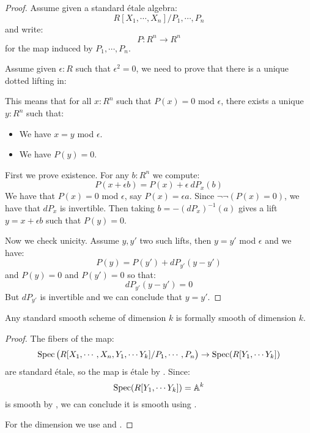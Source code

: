 \begin{proof}
Assume given a standard étale algebra:
\[R[X_1,\cdots,X_n]/P_1,\cdots,P_n\]
and write:
\[P:R^n\to R^n\]
for the map induced by $P_1,\cdots,P_n$.

Assume given $\epsilon:R$ such that $\epsilon^2=0$, we need to prove that there is a unique dotted lifting in:
  \begin{center}
    \end{center}
This means that for all $x:R^n$ such that $P(x)=0$ mod $\epsilon$, there exists a unique $y:R^n$ such that:
\begin{itemize} 
\item We have $x=y$ mod $\epsilon$.
\item We have $P(y)=0$.
\end{itemize}

First we prove existence. For any $b:R^n$ we compute:
\[P(x+\epsilon b) = P(x) + \epsilon\ dP_x(b)\]
We have that $P(x)=0$ mod $\epsilon$, say $P(x) = \epsilon a$. Since $\neg\neg(P(x) = 0)$, we have that $dP_x$ is invertible. Then taking $b = -(dP_x)^{-1}(a)$ gives a lift $y=x+\epsilon b$ such that $P(y) = 0$.

Now we check unicity. Assume $y,y'$ two such lifts, then $y=y'$ mod $\epsilon$ and we have:
\[P(y) = P(y') + dP_{y'}(y-y')\]
and $P(y)=0$ and $P(y')=0$ so that:
\[dP_{y'}(y-y') = 0\]
But $dP_{y'}$ is invertible and we can conclude that $y=y'$.
\end{proof}

\begin{lemma}\label{standard-smooth-is-smooth}
Any standard smooth scheme of dimension $k$ is formally smooth of dimension $k$.
\end{lemma}

\begin{proof}
The fibers of the map:
\[\operatorname{Spec}\big(R[X_1,\cdots,X_n,Y_1,\cdots Y_{k}] / P_1,\cdots,P_n\big) \to \operatorname{Spec}(R[Y_1,\cdots Y_{k}])\]
are standard étale, so the map is étale by . Since:
\[\operatorname{Spec}(R[Y_1,\cdots Y_{k}]) = \mathbb{A}^k\]
is smooth by , we can conclude it is smooth using . 

For the dimension we use  and .
\end{proof}



